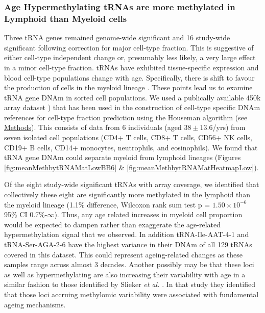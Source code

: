 \documentclass[
]{book}
\begin{document}
\hypertarget{age-hypermethylating-trnas-are-more-methylated-in-lymphoid-than-myeloid-cells}{%
\subsubsection{Age Hypermethylating tRNAs are more methylated in Lymphoid than Myeloid cells}\label{age-hypermethylating-trnas-are-more-methylated-in-lymphoid-than-myeloid-cells}}

Three tRNA genes remained genome-wide significant and 16 study-wide significant following correction for major cell-type fraction.
This is suggestive of either cell-type independent change or, presumably less likely, a very large effect in a minor cell-type fraction.
tRNAs have exhibited tissue-specific expression \citep{Schmitt2014b, Dittmar2006, Sagi2016} and blood cell-type populations change with age.
Specifically, there is shift to favour the production of cells in the myeloid lineage \citep{Geiger2013}.
These points lead us to examine tRNA gene DNAm in sorted cell populations.
We used a publically available 450k array dataset \citep{Reinius2012}) that has been used in the construction of cell-type specific DNAm references for cell-type fraction prediction using the Houseman algorithm \citep{Houseman2012} (see \protect\hyperlink{sortedbloodmethods}{Methods}).
This consists of data from 6 individuals (aged \(38 \pm 13.6\)/yrs) from seven isolated cell populations (CD4+ T cells, CD8+ T cells, CD56+ NK cells, CD19+ B cells, CD14+ monocytes, neutrophils, and eosinophils).
We found that tRNA gene DNAm could separate myeloid from lymphoid lineages (Figures \ref{fig:meanMethbytRNAMatLowBB6} \& \ref{fig:meanMethbytRNAMatHeatmapLow}).

Of the eight study-wide significant tRNAs with array coverage, we identified that collectively these eight are significantly more methylated in the lymphoid than the myeloid lineage (1.1\% difference, Wilcoxon rank sum test p = \(1.50\times10^{-6}\) 95\% CI 0.7\%-\(\infty\)).
Thus, any age related increases in myeloid cell proportion would be expected to dampen rather than exaggerate the age-related hypermethylation signal that we observed.
In addition tRNA-Ile-AAT-4-1 and tRNA-Ser-AGA-2-6 have the highest variance in their DNAm of all 129 tRNAs covered in this dataset.
This could represent ageing-related changes as these samples range across almost 3 decades.
Another possibly may be that these loci as well as hypermethylating are also increasing their variability with age in a similar fashion to those identified by Slieker \emph{et al.} \citep{Slieker2016}.
In that study they identified that those loci accruing methylomic variability were associated with fundamental ageing mechanisms.
\end{document}
